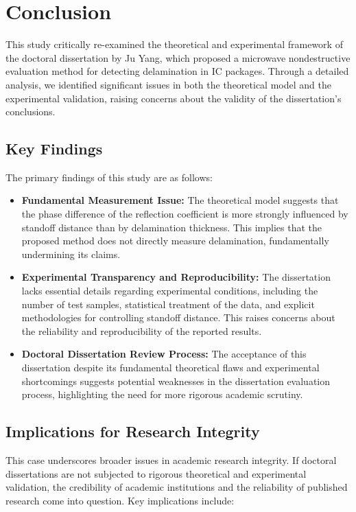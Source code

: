 \documentclass[10pt,twocolumn]{article}
\begin{document}
\section{Conclusion}

This study critically re-examined the theoretical and experimental framework of the doctoral dissertation by Ju Yang, which proposed a microwave nondestructive evaluation method for detecting delamination in IC packages. Through a detailed analysis, we identified significant issues in both the theoretical model and the experimental validation, raising concerns about the validity of the dissertation’s conclusions.

\subsection{Key Findings}

The primary findings of this study are as follows:

\begin{itemize}
    \item \textbf{Fundamental Measurement Issue:} The theoretical model suggests that the phase difference of the reflection coefficient is more strongly influenced by standoff distance than by delamination thickness. This implies that the proposed method does not directly measure delamination, fundamentally undermining its claims.
    \item \textbf{Experimental Transparency and Reproducibility:} The dissertation lacks essential details regarding experimental conditions, including the number of test samples, statistical treatment of the data, and explicit methodologies for controlling standoff distance. This raises concerns about the reliability and reproducibility of the reported results.
    \item \textbf{Doctoral Dissertation Review Process:} The acceptance of this dissertation despite its fundamental theoretical flaws and experimental shortcomings suggests potential weaknesses in the dissertation evaluation process, highlighting the need for more rigorous academic scrutiny.
\end{itemize}

\subsection{Implications for Research Integrity}

This case underscores broader issues in academic research integrity. If doctoral dissertations are not subjected to rigorous theoretical and experimental validation, the credibility of academic institutions and the reliability of published research come into question. Key implications include:
\end{document}
